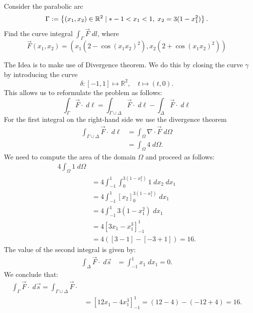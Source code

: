 \documentclass[11pt]{article}
\begin{document}
\begin{exercise}
    Consider the parabolic arc 
    \[
        \Gamma := \left\{ (x_1,x_2) \in \bbR^{2} \suchthat* -1 < x_1 < 1, \; x_2 = 3 ( 1 - x_1^2 ) \right\}.
    \]
    Find the curve integral $\int_\Gamma \vec F \;dl$, where 
    \[
        \vec F(x_1,x_2) = \left( x_1 ( 2 - \cos(x_1x_2)^{2} ), x_2 ( 2 + \cos(x_1x_2)^{2} ) \right)
    \]
\end{exercise}
\begin{solution}
    The Idea is to make use of Divergence theorem. We do this by closing the curve $\gamma$ by introducing the curve 
    \[
        \delta: [-1,1] \mapsto \mathbb{R}^2, \quad t \mapsto  (t,0).
    \]
    This allows us to reformulate the problem as follows:
    \[
        \int_{\Gamma} \vec{F} \cdot \; d\ell
        =
        \int_{\Gamma\cup \Delta} \vec{F} \cdot \; d\ell
        -
        \int_{\Delta} \vec{F}\cdot \;d \ell
    \]
    For the first integral on the right-hand side we use the divergence theorem
    \begin{align*}
        \int_{\Gamma\cup\Delta} \vec{F} \cdot \; d\ell 
        &= 
        \int_{\Omega} \nabla\cdot\vec{F}\;d \Omega
        \\&=
        \int_{\Omega} 4\;d \Omega
        .
    \end{align*}
    We need to compute the area of the domain $\Omega$ and proceed as follows: 
    \begin{align*}
        4\int_{\Omega} 1\;d \Omega
        \\&=
        4 \int_{-1}^1\int_{0}^{3(1-x_1^2)} 1 \;d x_2 \;d x_1
        \\&=
        4 \int_{-1}^1\left[x_2\right]_{0}^{3(1-x_1^2)} \;d x_1
        \\&=
        4 \int_{-1}^1 3( 1-x_1^2)\;d x_1
        \\&=
        4 \left[ 3 x_1 - x_1^3 \right]_{-1}^1
        \\&=
        4 \left( \left[ 3 - 1 \right] - \left[ -3 + 1 \right] \right)
        = 
        16
        .
    \end{align*}
    The value of the second integral is given by:
    \begin{align*}
        \int_{\Delta} \vec{F} \cdot \; d\vec{s} 
        &
        =
        \int_{-1}^1 x_1 \; dx_1
        =
        0
        .
    \end{align*}
    We conclude that:
    \begin{align*}
        \int_{\Gamma} \vec{F} \cdot \; d\vec{s} = \int_{\Gamma\cup \Delta} \vec{F} \cdot 
        \\&=
        \left[ 12 x_1 - 4 x_1^3 \right]_{-1}^1
        =
        ( 12 - 4 ) - ( -12 + 4 )
        = 
        16.
    \end{align*}
\end{solution}
\end{document}
